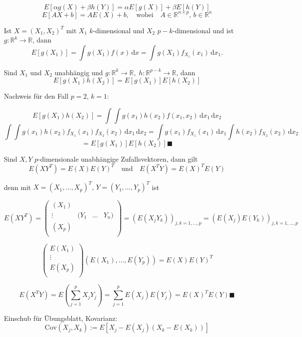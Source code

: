 \documentclass[12pt, a4paper]{article}
\theoremstyle{plain}
\theoremstyle{definition}
\newcommand{\R}{\mathbb{R}}
\newcommand{\1}{\mathds{1}}
\newcommand{\Cov}{\mathrm{Cov}}
\renewcommand{\d}{\,\mathrm{d}}
\providecommand{\mtext}[1]{\quad \text{#1} \quad}
\begin{document}
\[  E[\alpha g(X) + \beta  h(Y)   ]  = \alpha E[g(X)] + \beta E[h(Y)]   \]
\[  E[AX + b] = AE(X) + b, \mtext{wobei} A \in \R^{n \times p}, \, b \in \R^n   \]


Ist $X = (X_1, X_2)^T$ mit $X_1$ $k$-dimensional und $X_2$ $p-k$-dimensional und ist $g:\R^k \to \R$, dann 
\[ E[g(X_1)]  = \int g(X_1) f(x) \d x = \int g(X_1)  f_{X_1} (x_1) \d x_1. \]

Sind $X_1$ und $X_2$ unabhängig und $g:\R^k \to \R, \; h:\R^{p-k} \to \R$, dann
\[ E[g(X_1) h(X_2)] = E[g(X_1)]E[h(X_2)]    \]

Nachweis für den Fall $p=2, \, k = 1$:

\[ E[g(X_1) h(X_2)] =  \int \int g(x_1)h(x_2) f(x_1, x_2) \d x_1 \d x_2 \]
\[\int \int g(x_1)h(x_2) f_{X_1} (x_1) f_{X_2}(x_2) \d x_1  \d x_2    = \int g(x_1) f_{X_1} (x_1) \d x_1  \int  h(x_2) f_{X_2} (x_2) \d x_2\]
\[ = E[g(X_1)] E[h(X_2)] \blacksquare  \]


Sind $X,Y$ $p$-dimensionale unabhängige Zufallsvektoren, dann gilt 
\[  E(XY^T) = E(X) E(Y)^T \mtext{und} E(X^T Y) = E(X)^T E(Y)    \]

denn mit $X = (X_1, \ldots, X_p)^T, \, Y=(Y_1, \ldots, Y_p)^T $ ist

\[  E(XY^T) =     \begin{pmatrix}

(X_1)  &  & &  \\
\vdots & (Y_1 & \ldots & Y_n) \\
(X_p) &  & & \\

\end{pmatrix}  = (E(X_jY_k))_{j,k = 1,\ldots,p}  = (E(X_j)E(Y_k))_{j,k = 1, \ldots, p}   \]

\[ \begin{pmatrix}

E(X_1)   \\
\vdots \\
E(X_p) \\

\end{pmatrix} (E(X_1), \ldots, E(Y_p)) = E(X) E(Y)^T  \]

\[ E(X^T Y) = E(\sum_{j=1}^{p} X_j Y_j) = \sum_{j=1}^{p} E(X_j) E(Y_j) = E(X)^T E(Y) \blacksquare  \]


Einschub für Übungsblatt, Kovarianz:
\[  \Cov(X_j, X_k) := E[X_j - E(X_j) (X_k - E(X_k))]  \]




\end{document}
